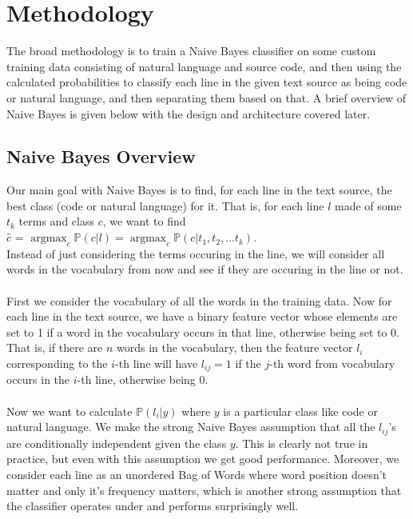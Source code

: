\documentclass[12pt]{scrreprt}
\DeclareMathOperator*{\argmax}{argmax} %
\newcommand{\pr}{\mathbb{P}}
\begin{document}

\section{Methodology}

The broad methodology is to train a Naive Bayes classifier on some custom training data consisting of natural language and source code, and then using the calculated probabilities to classify each line in the given text source as being code or natural language, and then separating them based on that. A brief overview of Naive Bayes is given below with the design and architecture covered later.
\subsection{Naive Bayes Overview}
Our main goal with Naive Bayes is to find, for each line in the text source, the best class (code or natural language) for it. That is, for each line $l$ made of some $t_k$ terms and class $c$, we want to find \\ $\hat{c}$ = $ \argmax_c \pr(c | l) = \argmax_c \pr(c | t_1, t_2, ... t_k)$. \\ Instead of just considering the terms occuring in the line, we will consider all words in the vocabulary from now and see if they are occuring in the line or not.\\
\\ First we consider the vocabulary of all the words in the training data. Now for each line in the text source, we have a binary feature vector whose elements are set to 1 if a word in the vocabulary occurs in that line, otherwise being set to 0. That is, if there are $n$ words in the vocabulary, then the feature vector $l_i$ corresponding to the $i$-th line will have $l_{ij} = 1$ if the $j$-th word from vocabulary occurs in the $i$-th line, otherwise being 0.\\
\\ Now we want to calculate $\mathbb{P}(l_i | y)$ where $y$ is a particular class like code or natural language. We make the strong Naive Bayes assumption that all the $l_{ij}$'s are conditionally independent given the class $y$. This is clearly not true in practice, but even with this assumption we get good performance. 
Moreover, we consider each line as an unordered Bag of Words where word position doesn't matter and only it's frequency matters, which is another strong assumption that the classifier operates under and performs surprisingly well.\\
\end{document}
